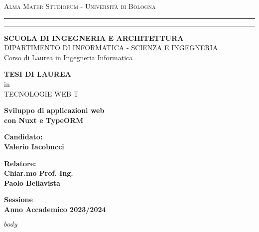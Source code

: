 \documentclass[12pt,a4paper]{report}
\begin{document}
\begin{titlepage}
	\begin{center}
	{{\Large{\textsc{Alma Mater Studiorum - Universit\`a di
	Bologna}}}} \rule[0.1cm]{15.8cm}{0.1mm}
	\rule[0.5cm]{15.8cm}{0.6mm}
	{\small{\bf SCUOLA DI INGEGNERIA E ARCHITETTURA}\\
	DIPARTIMENTO DI INFORMATICA - SCIENZA E INGEGNERIA\\
	Corso di Laurea in Ingegneria Informatica}
	\end{center}
	\vspace{15mm}
	\begin{center}
	{\large{\bf TESI DI LAUREA}}\\
	\vspace{2mm}
	{\large{in}}\\
	\vspace{2mm}
	{\large{TECNOLOGIE WEB T}}\\
	\end{center}
	\vspace{15mm}
	\begin{center}
	{\LARGE{\bf Sviluppo di applicazioni web}}\\
	\vspace{3mm}
	{\LARGE{\bf con Nuxt e TypeORM}}\\
	\end{center}
	\vspace{40mm}
	\par
	\noindent
	\begin{minipage}[t]{0.47\textwidth}
	{\large{\bf Candidato:\\
	Valerio Iacobucci}}
	\end{minipage}
	\hfill
	\begin{minipage}[t]{0.47\textwidth}\raggedleft
	{\large{\bf Relatore:\\
	Chiar.mo Prof. Ing.\\
	Paolo Bellavista}}
	\end{minipage}
	\vspace{20mm}
	\begin{center}
	{\large{\bf Sessione\\
	Anno Accademico 2023/2024 }}
	\end{center}
\end{titlepage}

\shipout\null

\begingroup
	\hypersetup{linkcolor=black}
	\tableofcontents
\endgroup

\newpage

$body$
\end{document}
